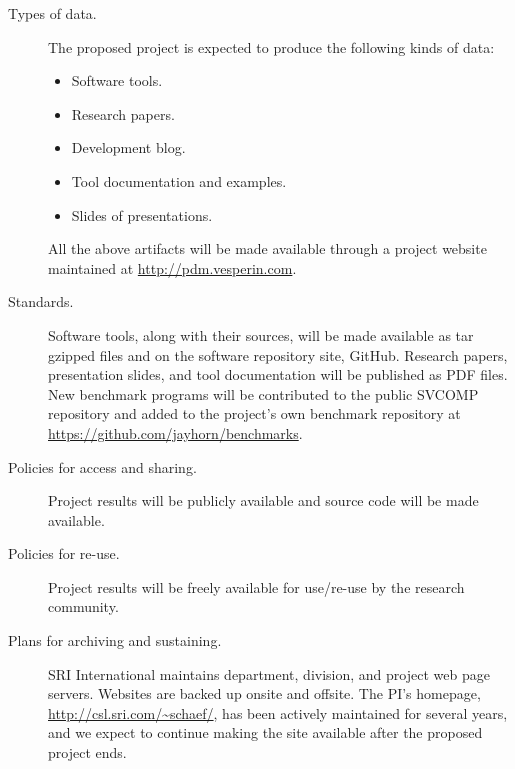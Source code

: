 \begin{description}
\item[Types of data.]
 The proposed project is expected to produce the following kinds of data:
 \begin{itemize}
  \item Software tools.
  \item Research papers.
  \item Development blog.
  \item Tool documentation and examples.
  \item Slides of presentations.
 \end{itemize}
 All the above artifacts will be made available through a project website maintained at {\url{http://pdm.vesperin.com}}.
 
\item[Standards.]
Software tools, along with their sources, will be made available as tar gzipped files and on the software repository site, GitHub. Research papers, presentation slides, and tool documentation will be published as PDF files. New benchmark programs will be contributed to the public SVCOMP repository and added to the project's own benchmark
repository at \url{https://github.com/jayhorn/benchmarks}. 
 
%
\item[Policies for access and sharing.]
Project results will be publicly available and source code will be made available. 

%
%
\item[Policies for re-use.]
Project results will be freely available for use/re-use by the research community.

\item[Plans for archiving and sustaining.]
SRI International maintains department, division, and project web page servers. Websites are backed up onsite and offsite. The PI's homepage, {\url{http://csl.sri.com/~schaef/}}, has been actively maintained for several years, and we expect to continue making the site
available after the proposed project ends.

\end{description}
